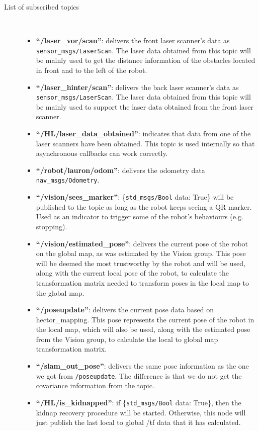 \begin{description}
\item[List of subscribed topics]\
	\begin{itemize}
	\item \textbf{``/laser\_vor/scan''}: delivers the front laser scanner's data as \texttt{sensor\_msgs/LaserScan}. The laser data obtained from this topic will be mainly used to get the distance information of the obstacles located in front and to the left of the robot.
	\item \textbf{``/laser\_hinter/scan''}: delivers the back laser scanner's data as \texttt{sensor\_msgs/LaserScan}. The laser data obtained from this topic will be mainly used to support the laser data obtained from the front laser scanner.
	\item \textbf{``/HL/laser\_data\_obtained''}: indicates that data from one of the laser scanners have been obtained. This topic is used internally so that asynchronous callbacks can work correctly.
	\item \textbf{``/robot/lauron/odom''}: delivers the odometry data \texttt{nav\_msgs/Odometry}.
	\item \textbf{``/vision/sees\_marker''}: \{\texttt{std\_msgs/Bool} data: True\} will be published to the topic as long as the robot keeps seeing a QR marker. Used as an indicator to trigger some of the robot's behaviours (e.g. stopping).
	\item \textbf{``/vision/estimated\_pose''}: delivers the current pose of the robot on the global map, as was estimated by the Vision group. This pose will be deemed the most trustworthy by the robot and will be used, along with the current local pose of the robot, to calculate the transformation matrix needed to transform poses in the local map to the global map.
	\item \textbf{``/poseupdate''}: delivers the current pose data based on hector\_mapping. This pose represents the current pose of the robot in the local map, which will also be used, along with the estimated pose from the Vision group, to calculate the local to global map transformation matrix.
	\item \textbf{``/slam\_out\_pose''}: delivers the same pose information as the one we got from \texttt{/poseupdate}. The difference is that we do not get the covariance information from the topic.
	\item \textbf{``/HL/is\_kidnapped''}: if \{\texttt{std\_msgs/Bool} data: True\}, then the kidnap recovery procedure will be started. Otherwise, this node will just publish the last local to global /tf data that it has calculated.
	\end{itemize}
\end{description}

